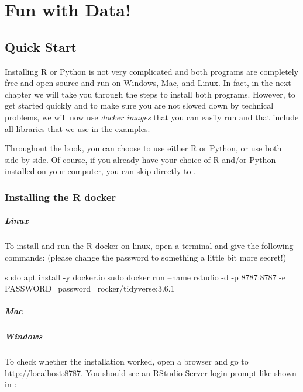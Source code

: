 \chapter{Fun with Data!}
\label{chap:fundata}

\section{Quick Start}

Installing R or Python is not very complicated and both programs are completely free and open source and run on Windows, Mac, and Linux.
In fact, in the next chapter we will take you through the steps to install both programs.
However, to get started quickly and to make sure you are not slowed down by technical problems,
we will now use \emph{docker images} that you can easily run and that include all libraries that we use in the examples.

Throughout the book, you can choose to use either R or Python, or use both side-by-side.
Of course, if you already have your choice of R and/or Python installed on your computer, you can skip directly to . 

\subsection{Installing the R docker}

\paragraph{Linux} To install and run the R docker on linux, open a terminal and give the following commands:
(please change the password to something a little bit more secret!)

\begin{terminal}
sudo apt install -y docker.io
sudo docker run --name rstudio -d -p 8787:8787 -e PASSWORD=password \
     rocker/tidyverse:3.6.1
\end{terminal}


\paragraph{Mac}

\paragraph{Windows} 

To check whether the installation worked, open a browser and go to \url{http://localhost:8787}.
You should see an RStudio Server login prompt like shown in \reffig{fun.rstudio.signin}:


